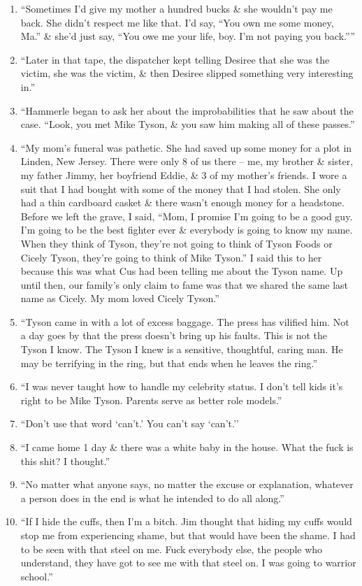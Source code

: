 \documentclass{article}
\numberwithin{equation}{section}
\begin{document}
\begin{enumerate}
	\item ``Sometimes I'd give my mother a hundred bucks \& she wouldn't pay me back. She didn't respect me like that. I'd say, ``You own me some money, Ma.'' \& she'd just say, ``You owe me your life, boy. I'm not paying you back.''''
	\item ``Later in that tape, the dispatcher kept telling Desiree that she was the victim, she was the victim, \& then Desiree slipped something very interesting in.''
	\item ``Hammerle began to ask her about the improbabilities that he saw about the case. ``Look, you met Mike Tyson, \& you saw him making all of these passes.''
	\item ``My mom's funeral was pathetic. She had saved up some money for a plot in Linden, New Jersey. There were only 8 of us there -- me, my brother \& sister, my father Jimmy, her boyfriend Eddie, \& 3 of my mother's friends. I wore a suit that I had bought with some of the money that I had stolen. She only had a thin cardboard casket \& there wasn't enough money for a headstone. Before we left the grave, I said, ``Mom, I promise I'm going to be a good guy. I'm going to be the best fighter ever \& everybody is going to know my name. When they think of Tyson, they're not going to think of Tyson Foods or Cicely Tyson, they're going to think of Mike Tyson.'' I said this to her because this was what Cus had been telling me about the Tyson name. Up until then, our family's only claim to fame was that we shared the same last name as Cicely. My mom loved Cicely Tyson.''
	\item ``Tyson came in with a lot of excess baggage. The press has vilified him. Not a day goes by that the press doesn't bring up his faults. This is not the Tyson I know. The Tyson I knew is a sensitive, thoughtful, caring man. He may be terrifying in the ring, but that ends when he leaves the ring.''
	\item ``I was never taught how to handle my celebrity status. I don't tell kids it's right to be Mike Tyson. Parents serve as better role models.''
	\item ``Don't use that word `can't.' You can't say `can't.''
	\item ``I came home 1 day \& there was a white baby in the house. What the fuck is this shit? I thought.''
	\item ``No matter what anyone says, no matter the excuse or explanation, whatever a person does in the end is what he intended to do all along.''
	\item ``If I hide the cuffs, then I'm a bitch. Jim thought that hiding my cuffs would stop me from experiencing shame, but that would have been the shame. I had to be seen with that steel on me. Fuck everybody else, the people who understand, they have got to see me with that steel on. I was going to warrior school.''

\end{enumerate}
\end{document}
